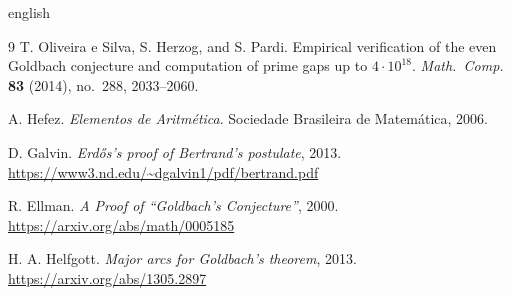 \documentclass[a4paper,11pt]{article}
\theoremstyle{definition}
\theoremstyle{remark}
\begin{document}
\begin{otherlanguage*}{english}
\begin{thebibliography}{9}
			T. Oliveira e Silva, S. Herzog, and S. Pardi.
			Empirical verification of the even Goldbach conjecture and computation of
			prime gaps up to \(4 \cdot 10^{18}\).
			\textit{Math.\ Comp.} \textbf{83} (2014), no.\ 288, 2033--2060.
			
			A. Hefez.
			\textit{Elementos de Aritmética}.
			Sociedade Brasileira de Matemática, 2006.
			
			D. Galvin.
			\textit{Erdős's proof of Bertrand's postulate}, 2013.
			\url{https://www3.nd.edu/~dgalvin1/pdf/bertrand.pdf}
			
			R. Ellman.
			\textit{A Proof of ``Goldbach's Conjecture''}, 2000.
			\url{https://arxiv.org/abs/math/0005185}
			
			H. A. Helfgott.
			\textit{Major arcs for Goldbach's theorem}, 2013.
			\url{https://arxiv.org/abs/1305.2897}
			
		\end{thebibliography}
		
	\end{otherlanguage*}
\end{document}
